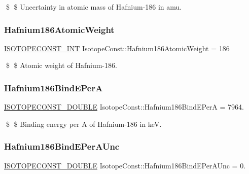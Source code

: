 \$ \$ Uncertainty in atomic mass of Hafnium-\/186 in amu. \mbox{\label{group___isotope_const-_hafnium-_hf186_gaedb632e87fbcae395dd018905f988eb3}} 
\subsubsection{\texorpdfstring{Hafnium186\+Atomic\+Weight}{Hafnium186AtomicWeight}}
{\footnotesize\ttfamily \mbox{\hyperlink{group___isotope_const-_macros_ga5f18360b3e99483a35c32d789e62621c}{I\+S\+O\+T\+O\+P\+E\+C\+O\+N\+S\+T\+\_\+\+I\+NT}} Isotope\+Const\+::\+Hafnium186\+Atomic\+Weight = 186}

\$ \$ Atomic weight of Hafnium-\/186. \mbox{\label{group___isotope_const-_hafnium-_hf186_gaca51f4c2b58d3e5e9d61f49c64591ff0}} 
\subsubsection{\texorpdfstring{Hafnium186\+Bind\+E\+PerA}{Hafnium186BindEPerA}}
{\footnotesize\ttfamily \mbox{\hyperlink{group___isotope_const-_macros_ga8f45a7272ce02c0b4c65c44636ed719a}{I\+S\+O\+T\+O\+P\+E\+C\+O\+N\+S\+T\+\_\+\+D\+O\+U\+B\+LE}} Isotope\+Const\+::\+Hafnium186\+Bind\+E\+PerA = 7964.}

\$ \$ Binding energy per A of Hafnium-\/186 in keV. \mbox{\label{group___isotope_const-_hafnium-_hf186_ga5429707837ba3b0e5b001adb162f55b6}} 
\subsubsection{\texorpdfstring{Hafnium186\+Bind\+E\+Per\+A\+Unc}{Hafnium186BindEPerAUnc}}
{\footnotesize\ttfamily \mbox{\hyperlink{group___isotope_const-_macros_ga8f45a7272ce02c0b4c65c44636ed719a}{I\+S\+O\+T\+O\+P\+E\+C\+O\+N\+S\+T\+\_\+\+D\+O\+U\+B\+LE}} Isotope\+Const\+::\+Hafnium186\+Bind\+E\+Per\+A\+Unc = 0.}

